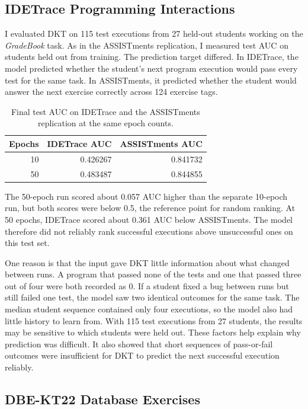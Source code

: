 \documentclass[11pt]{article}
\begin{document}
\subsection{IDETrace Programming Interactions}

I evaluated DKT on 115 test executions from 27 held-out students
working on the \textit{GradeBook} task. As in the ASSISTments
replication, I measured test AUC on students held out from training.
The prediction target differed. In IDETrace, the model predicted
whether the student's next program execution would pass every test
for the same task. In ASSISTments, it predicted whether the student
would answer the next exercise correctly across 124 exercise tags.

\begin{table}[H]
\centering
\small
\begin{tabular}{@{}rrr@{}}
\hline
Epochs & IDETrace AUC & ASSISTments AUC \\
\hline
10 & 0.426267 & 0.841732 \\
50 & 0.483487 & 0.844855 \\
\hline
\end{tabular}
\caption{Final test AUC on IDETrace and the ASSISTments replication
at the same epoch counts.}
\label{tab:idetrace-results}
\end{table}

The 50-epoch run scored about 0.057 AUC higher than the separate
10-epoch run, but both scores were below 0.5, the reference point
for random ranking. At 50 epochs, IDETrace scored about 0.361 AUC
below ASSISTments. The model therefore did not reliably rank
successful executions above unsuccessful ones on this test set.

One reason is that the input gave DKT little
information about what changed between runs. A program that passed
none of the tests and one that passed three out of four were both
recorded as 0. If a student fixed a bug between runs but still failed
one test, the model saw two identical outcomes for the same task.
The median student sequence contained only four executions, so the
model also had little history to learn from. With 115 test executions
from 27 students, the results may be sensitive to which students were
held out. These factors help explain why prediction was difficult. 
It also showed that short sequences of pass-or-fail outcomes
were insufficient for DKT to predict the next successful execution
reliably.

\subsection{DBE-KT22 Database Exercises}
\end{document}
